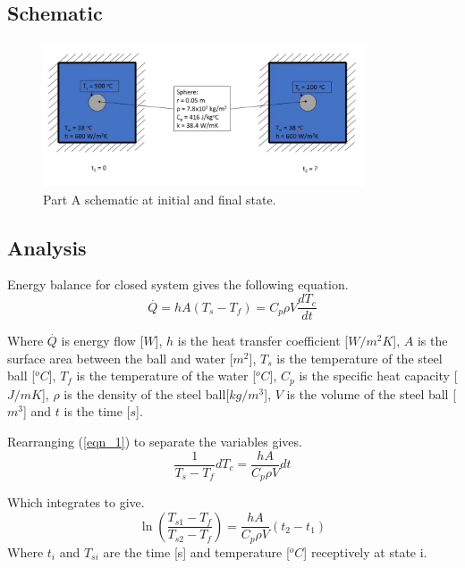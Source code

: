 \documentclass[11pt]{article}
\begin{document}
\subsection{Schematic}
\begin{figure}[!htbp]
	\centering
	\includegraphics[width=0.85\textwidth]{part_a_fig}
	\caption{Part A schematic at initial and final state.}
	\label{fig:schem_a}
\end{figure}
\FloatBarrier
\subsection{Analysis}

Energy balance for closed system gives the following equation.
\begin{equation}\label{eqn_1}
	\stackrel{.}{Q} = hA(T_{s}-T_{f}) = C_{p}\rho V \frac{dT_{c}}{dt}
\end{equation}

Where $\stackrel{.}{Q}$ is energy flow [$W$], $h$ is the heat transfer coefficient [$W/m^{2}K$], $A$ is the surface area between the ball and water [$m^{2}$], $T_{s}$ is the temperature of the steel ball [$^{o}C$], $T_{f}$ is the temperature of the water [$^{o}C$], $C_{p}$ is the specific heat capacity [$J/mK$], $\rho$ is the density of the steel ball[$kg/m^{3}$], $V$ is the volume of the steel ball [$m^3$] and $t$ is the time [$s$].
\newline

Rearranging (\ref{eqn_1}) to separate the variables gives.
\begin{equation}\label{key}
	\frac{1}{T_{s}-T_{f}} dT_{c} = \frac{hA}{C_{p}\rho V}dt
\end{equation}

Which integrates to give.
\begin{equation}\label{eqn_3}
	\ln{(\frac{T_{s1}-T_{f}}{T_{s2}-T_{f}})} =  \frac{hA}{C_{p}\rho V}(t_{2}-t_{1})
\end{equation}
Where $t_{i}$ and $T_{si}$ are the time [s] and temperature [$^oC$] receptively at state i.
\end{document}
